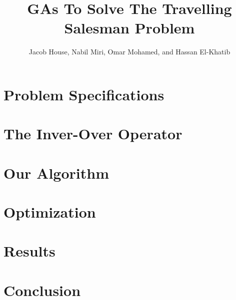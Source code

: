 \documentclass[12pt, twocolumn]{article}
\title{GAs To Solve The Travelling Salesman Problem}
\author{Jacob House, Nabil Miri, Omar Mohamed, and Hassan El-Khatib}
\begin{document}
	\maketitle
	\section{Problem Specifications}
	
	\section{The Inver-Over Operator}
	
	\section{Our Algorithm}
	
	\section{Optimization}
	
	\section{Results}
	
	\section{Conclusion}
	
	\printbibliography
\end{document}
